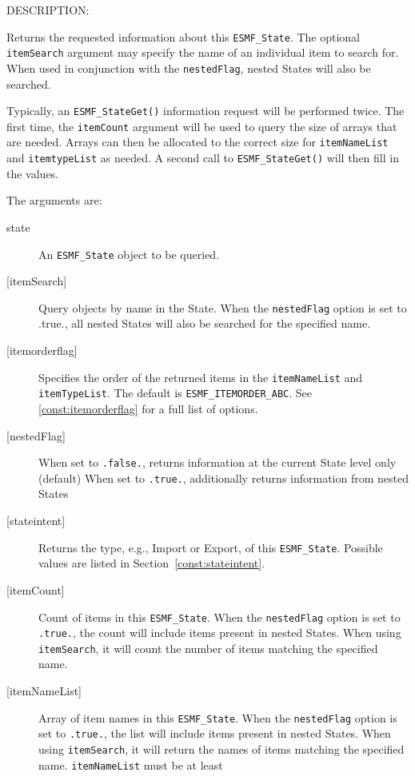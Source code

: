 {\sf DESCRIPTION:\\ }


   Returns the requested information about this {\tt ESMF\_State}.
   The optional {\tt itemSearch} argument may specify the name of
   an individual item to search for. When used in conjunction with
   the {\tt nestedFlag}, nested States will also be searched.
  
   Typically, an {\tt ESMF\_StateGet()} information request will be performed
   twice. The first time, the {\tt itemCount} argument will be used to
   query the size of arrays that are needed. Arrays can then be allocated
   to the correct size for {\tt itemNameList} and {\tt itemtypeList}
   as needed. A second call to {\tt ESMF\_StateGet()} will then fill in the
   values.
  
   The arguments are:
   \begin{description}
   \item[state]
   An {\tt ESMF\_State} object to be queried.
   \item[{[itemSearch]}]
   Query objects by name in the State. When the {\tt nestedFlag}
   option is set to .true., all nested States will also be searched
   for the specified name.
   \item[{[itemorderflag]}]
   Specifies the order of the returned items in the {\tt itemNameList}
   and {\tt itemTypeList}. The default is {\tt ESMF\_ITEMORDER\_ABC}.
   See \ref{const:itemorderflag} for a full list of options.
   \item[{[nestedFlag]}]
   When set to {\tt .false.}, returns information at the current
   State level only (default)
   When set to {\tt .true.}, additionally returns information from
   nested States
   \item[{[stateintent]}]
   Returns the type, e.g., Import or Export, of this {\tt ESMF\_State}.
   Possible values are listed in Section~\ref{const:stateintent}.
   \item[{[itemCount]}]
   Count of items in this {\tt ESMF\_State}.
   When the {\tt nestedFlag} option is
   set to {\tt .true.}, the count will include items present in nested
   States. When using {\tt itemSearch}, it will count the number of
   items matching the specified name.
   \item[{[itemNameList]}]
   Array of item names in this {\tt ESMF\_State}.
   When the {\tt nestedFlag} option is
   set to {\tt .true.}, the list will include items present in nested
   States. When using {\tt itemSearch}, it will return the names of
   items matching the specified name. {\tt itemNameList} must be at least

\end{description}
